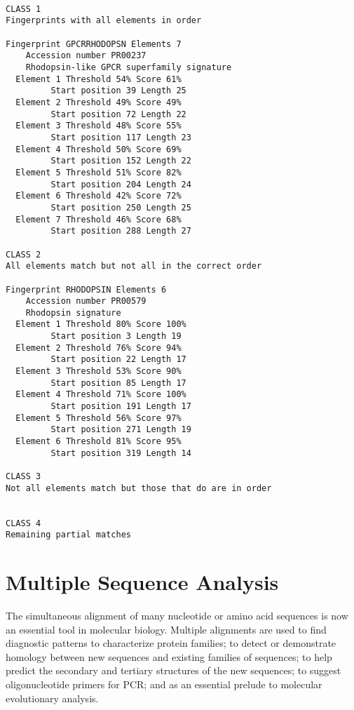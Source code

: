 \documentclass[12pt]{report}
\begin{document}
\unix{}\\
\\
\\
\\
\\
\\
\\
\\

\unix{}
\begin{verbatim}
CLASS 1
Fingerprints with all elements in order

Fingerprint GPCRRHODOPSN Elements 7
    Accession number PR00237
    Rhodopsin-like GPCR	superfamily signature
  Element 1 Threshold 54% Score	61%
	     Start position 39 Length 25
  Element 2 Threshold 49% Score	49%
	     Start position 72 Length 22
  Element 3 Threshold 48% Score	55%
	     Start position 117	Length 23
  Element 4 Threshold 50% Score	69%
	     Start position 152	Length 22
  Element 5 Threshold 51% Score	82%
	     Start position 204	Length 24
  Element 6 Threshold 42% Score	72%
	     Start position 250	Length 25
  Element 7 Threshold 46% Score	68%
	     Start position 288	Length 27

CLASS 2
All elements match but not all in the correct order

Fingerprint RHODOPSIN Elements 6
    Accession number PR00579
    Rhodopsin signature
  Element 1 Threshold 80% Score	100%
	     Start position 3 Length 19
  Element 2 Threshold 76% Score	94%
	     Start position 22 Length 17
  Element 3 Threshold 53% Score	90%
	     Start position 85 Length 17
  Element 4 Threshold 71% Score	100%
	     Start position 191	Length 17
  Element 5 Threshold 56% Score	97%
	     Start position 271	Length 19
  Element 6 Threshold 81% Score	95%
	     Start position 319	Length 14

CLASS 3
Not all	elements match but those that do are in	order


CLASS 4
Remaining partial matches

\end{verbatim}

\section{Multiple Sequence Analysis}
\label{sec:MSA}
The simultaneous alignment of many nucleotide or amino acid sequences
is now an essential tool in molecular biology.	Multiple alignments are
used to	find diagnostic	patterns to characterize protein families; to
detect or demonstrate homology between new sequences and existing
families of sequences; to help predict the secondary and tertiary
structures of the new sequences; to suggest oligonucleotide primers
for PCR; and as	an essential prelude to	molecular evolutionary
analysis.
\end{document}
